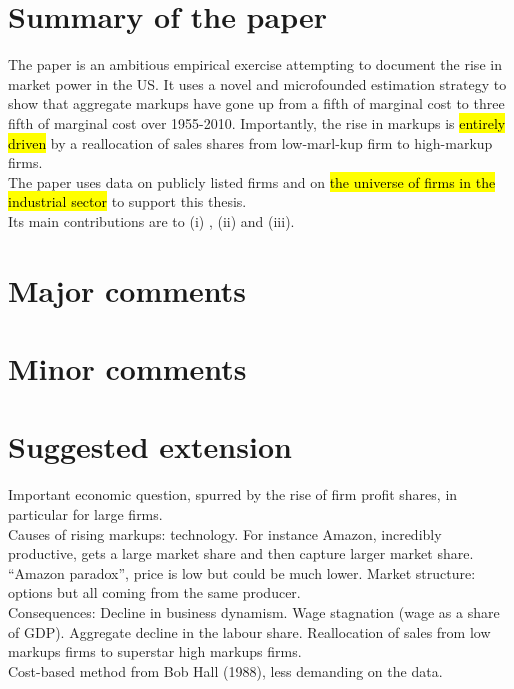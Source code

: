 \documentclass{amsart}
\theoremstyle{definition}
\theoremstyle{remark}
\numberwithin{equation}{section}
\begin{document}
\section{Summary of the paper}

The paper is an ambitious empirical exercise attempting to document the rise in market power in the US. It uses a novel and microfounded estimation strategy to show that aggregate markups have gone up from a fifth of marginal cost to three fifth of marginal cost over 1955-2010. Importantly, the rise in markups is \hl{entirely driven} by a reallocation of sales shares from low-marl-kup firm to high-markup firms.\\

The paper uses data on publicly listed firms and on \hl{the universe of firms in the industrial sector} to support this thesis.\\

Its main contributions are to (i) , (ii) and (iii).

\section{Major comments}

\section{Minor comments}

\section{Suggested extension}

Important economic question, spurred by the rise of firm profit shares, in particular for large firms.\\

Causes of rising markups: technology. For instance Amazon, incredibly productive, gets a large market share and then capture larger market share. ``Amazon paradox'', price is low but could be much lower. Market structure: options but all coming from the same producer.\\

Consequences: Decline in business dynamism. Wage stagnation (wage as a share of GDP). Aggregate decline in the labour share. Reallocation of sales from low markups firms to superstar high markups firms.\\

Cost-based method from Bob Hall (1988), less demanding on the data. \\
\end{document}
